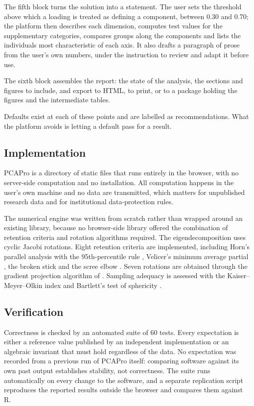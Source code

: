\documentclass[12pt]{article}
\begin{document}
The fifth block turns the solution into a statement. The user sets the threshold
above which a loading is treated as defining a component, between 0.30 and 0.70;
the platform then describes each dimension, computes test values for the
supplementary categories, compares groups along the components and lists the
individuals most characteristic of each axis. It also drafts a paragraph of
prose from the user's own numbers, under the instruction to review and adapt it
before use.

The sixth block assembles the report: the state of the analysis, the sections
and figures to include, and export to HTML, to print, or to a package holding
the figures and the intermediate tables.

Defaults exist at each of these points and are labelled as recommendations. What
the platform avoids is letting a default pass for a result.

\subsection{Implementation}

PCAPro is a directory of static files that runs entirely in the browser, with
no server-side computation and no installation. All computation happens in the
user's own machine and no data are transmitted, which matters for unpublished
research data and for institutional data-protection rules.

The numerical engine was written from scratch rather than wrapped around an
existing library, because no browser-side library offered the combination of
retention criteria and rotation algorithms required. The eigendecomposition uses
cyclic Jacobi rotations. Eight retention criteria are implemented, including
Horn's parallel analysis \citep{horn1965} with the 95th-percentile rule
\citep{glorfeld1995}, Velicer's minimum average partial \citep{velicer1976},
the broken stick \citep{frontier1976} and the scree elbow \citep{cattell1966}.
Seven rotations \citep{kaiser1958, hendrickson1964} are obtained through the
gradient projection algorithm of \citet{jennrich2001, jennrich2002}. Sampling
adequacy is assessed with the Kaiser--Meyer--Olkin index \citep{kaiser1974} and
Bartlett's test of sphericity \citep{bartlett1950}.

\subsection{Verification}

Correctness is checked by an automated suite of 60 tests. Every expectation is
either a reference value published by an independent implementation or an
algebraic invariant that must hold regardless of the data. No expectation was
recorded from a previous run of PCAPro itself: comparing software against its
own past output establishes stability, not correctness. The suite runs
automatically on every change to the software, and a separate replication
script reproduces the reported results outside the browser and compares them
against R.
\end{document}
